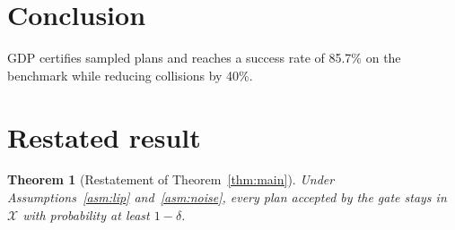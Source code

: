 \documentclass[letterpaper,10pt]{article}
\newtheorem{theorem}{Theorem}
\begin{document}
\section{Conclusion}\label{sec:conclusion}
GDP certifies sampled plans and reaches a success rate of 85.7\% on the benchmark while
reducing collisions by 40\%.





\appendix
\section{Restated result}\label{sec:appendix}
\begin{theorem}[Restatement of Theorem~\ref{thm:main}]
Under Assumptions~\ref{asm:lip} and~\ref{asm:noise}, every plan accepted by the gate stays in
$\mathcal{X}$ with probability at least $1-\delta$.
\end{theorem}
\end{document}
